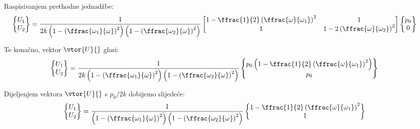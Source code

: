 Raspisivanjem prethodne jednadžbe:
\begin{equation}
    \begin{Bmatrix}
        U_1\\
        U_2
    \end{Bmatrix}
    =
    \frac{1}{2k\left(1-\left(\ffrac{\omega_1}{\omega}\right)^2\right)\left(1-\left(\ffrac{\omega_2}{\omega}\right)^2\right)}
    \begin{bmatrix}
        1-\ffrac{1}{2}\left(\ffrac{\omega}{\omega_1}\right)^2 & 1 \\
        1 & 1-2\left(\ffrac{\omega}{\omega_2}\right)^2
    \end{bmatrix}
    \begin{Bmatrix}
        p_0\\
        0
    \end{Bmatrix}
\end{equation}

Te konačno, vektor $\vtor{U}{}$ glasi:
\begin{equation}\label{eq:vektor_u_konacno}
    \begin{Bmatrix}
        U_1\\
        U_2
    \end{Bmatrix}
    =
    \frac{1}{2k\left(1-\left(\ffrac{\omega_1}{\omega}\right)^2\right)\left(1-\left(\ffrac{\omega_2}{\omega}\right)^2\right)}
    \begin{Bmatrix}
        p_0\left(1-\ffrac{1}{2}\left(\ffrac{\omega}{\omega_1}\right)^2\right)\\
        p_0 
    \end{Bmatrix}
\end{equation}

Dijeljenjem vektora $\vtor{U}{}$ s $p_0/2k$ dobijemo slijedeće:
\begin{equation}
    \begin{Bmatrix}
        U_1\\
        U_2
    \end{Bmatrix}
    =
    \frac{1}{\left(1-\left(\ffrac{\omega_1}{\omega}\right)^2\right)\left(1-\left(\ffrac{\omega_2}{\omega}\right)^2\right)}
    \begin{Bmatrix}
        1-\ffrac{1}{2}\left(\ffrac{\omega}{\omega_1}\right)^2\\
        1 
    \end{Bmatrix}
\end{equation}



